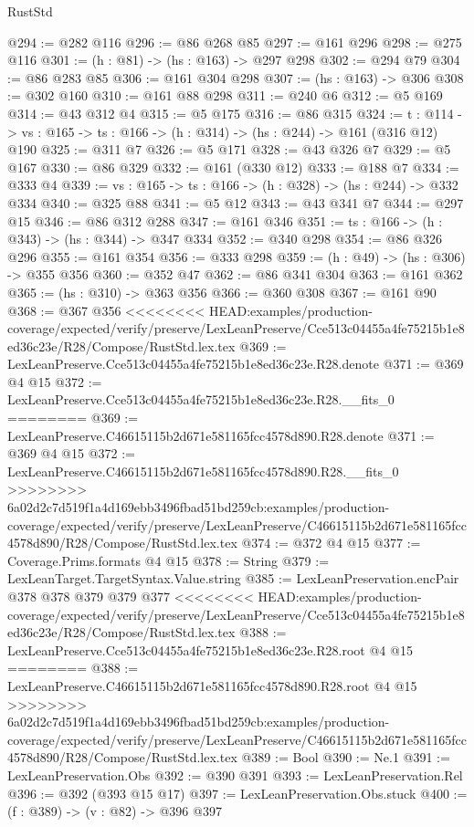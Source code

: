 \begin{lexlean}{RustStd}
\begin{coremodule}
{\begin{coremodule}
@294 := @282 @116
@296 := @86 @268 @85
@297 := @161 @296
@298 := @275 @116
@301 := (h : @81) -> (hs : @163) -> @297 @298
@302 := @294 @79
@304 := @86 @283 @85
@306 := @161 @304 @298
@307 := (hs : @163) -> @306
@308 := @302 @160
@310 := @161 @88 @298
@311 := @240 @6
@312 := @5 @169
@314 := @43 @312 @4
@315 := @5 @175
@316 := @86 @315
@324 := {t : @114} ->
  {vs : @165} -> {ts : @166} -> (h : @314) -> (hs : @244) -> @161 (@316 @12) @190
@325 := @311 @7
@326 := @5 @171
@328 := @43 @326 @7
@329 := @5 @167
@330 := @86 @329
@332 := @161 (@330 @12)
@333 := @188 @7
@334 := @333 @4
@339 := {vs : @165} -> {ts : @166} -> (h : @328) -> (hs : @244) -> @332 @334
@340 := @325 @88
@341 := @5 @12
@343 := @43 @341 @7
@344 := @297 @15
@346 := @86 @312 @288
@347 := @161 @346
@351 := {ts : @166} -> (h : @343) -> (hs : @344) -> @347 @334
@352 := @340 @298
@354 := @86 @326 @296
@355 := @161 @354
@356 := @333 @298
@359 := (h : @49) -> (hs : @306) -> @355 @356
@360 := @352 @47
@362 := @86 @341 @304
@363 := @161 @362
@365 := (hs : @310) -> @363 @356
@366 := @360 @308
@367 := @161 @90
@368 := @367 @356
<<<<<<<< HEAD:examples/production-coverage/expected/verify/preserve/LexLeanPreserve/Cce513c04455a4fe75215b1e8ed36c23e/R28/Compose/RustStd.lex.tex
@369 := LexLeanPreserve.Cce513c04455a4fe75215b1e8ed36c23e.R28.denote
@371 := @369 @4 @15
@372 := LexLeanPreserve.Cce513c04455a4fe75215b1e8ed36c23e.R28.__fits_0
========
@369 := LexLeanPreserve.C46615115b2d671e581165fcc4578d890.R28.denote
@371 := @369 @4 @15
@372 := LexLeanPreserve.C46615115b2d671e581165fcc4578d890.R28.__fits_0
>>>>>>>> 6a02d2c7d519f1a4d169ebb3496fbad51bd259cb:examples/production-coverage/expected/verify/preserve/LexLeanPreserve/C46615115b2d671e581165fcc4578d890/R28/Compose/RustStd.lex.tex
@374 := @372 @4 @15
@377 := Coverage.Prims.formats @4 @15
@378 := String
@379 := LexLeanTarget.TargetSyntax.Value.string
@385 := LexLeanPreservation.encPair @378 @378 @379 @379 @377
<<<<<<<< HEAD:examples/production-coverage/expected/verify/preserve/LexLeanPreserve/Cce513c04455a4fe75215b1e8ed36c23e/R28/Compose/RustStd.lex.tex
@388 := LexLeanPreserve.Cce513c04455a4fe75215b1e8ed36c23e.R28.root @4 @15
========
@388 := LexLeanPreserve.C46615115b2d671e581165fcc4578d890.R28.root @4 @15
>>>>>>>> 6a02d2c7d519f1a4d169ebb3496fbad51bd259cb:examples/production-coverage/expected/verify/preserve/LexLeanPreserve/C46615115b2d671e581165fcc4578d890/R28/Compose/RustStd.lex.tex
@389 := Bool
@390 := Ne.{1}
@391 := LexLeanPreservation.Obs
@392 := @390 @391
@393 := LexLeanPreservation.Rel
@396 := @392 (@393 @15 @17)
@397 := LexLeanPreservation.Obs.stuck
@400 := (f : @389) -> (v : @82) -> @396 @397

\end{coremodule}}
\end{coremodule}
\end{lexlean}

